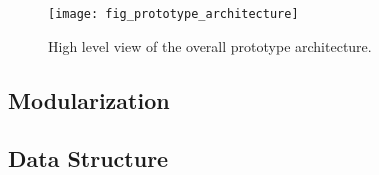\begin{figure}
  \begin{whole}
    \centering
    \texttt{[image: fig\_prototype\_architecture]}
    \caption[Prototype Architecture]{
      High level view of the overall prototype architecture.
    }
    \label{figure:fig.prototype.architecture}
  \end{whole}
\end{figure}


\subsection{Modularization}


\subsection{Data Structure}

